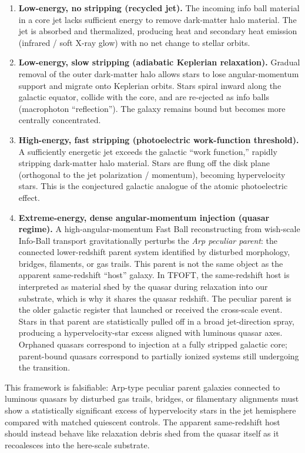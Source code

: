 \documentclass[11pt,a4paper]{article}
\begin{document}
\begin{enumerate}
  \item \textbf{Low-energy, no stripping (recycled jet).} The incoming info ball material in a core jet lacks sufficient energy to remove dark-matter halo material. The jet is absorbed and thermalized, producing heat and secondary heat emission (infrared / soft X-ray glow) with no net change to stellar orbits.

  \item \textbf{Low-energy, slow stripping (adiabatic Keplerian relaxation).} Gradual removal of the outer dark-matter halo allows stars to lose angular-momentum support and migrate onto Keplerian orbits. Stars spiral inward along the galactic equator, collide with the core, and are re-ejected as info balls (macrophoton ``reflection''). The galaxy remains bound but becomes more centrally concentrated.

  \item \textbf{High-energy, fast stripping (photoelectric work-function threshold).} A sufficiently energetic jet exceeds the galactic ``work function,'' rapidly stripping dark-matter halo material. Stars are flung off the disk plane (orthogonal to the jet polarization / momentum), becoming hypervelocity stars. This is the conjectured galactic analogue of the atomic photoelectric effect.

  \item \textbf{Extreme-energy, dense angular-momentum injection (quasar regime).} A high-angular-momentum Fast Ball reconstructing from wish-scale Info-Ball transport gravitationally perturbs the \emph{Arp peculiar parent}: the connected lower-redshift parent system identified by disturbed morphology, bridges, filaments, or gas trails. This parent is not the same object as the apparent same-redshift ``host'' galaxy. In TFOFT, the same-redshift host is interpreted as material shed by the quasar during relaxation into our substrate, which is why it shares the quasar redshift. The peculiar parent is the older galactic register that launched or received the cross-scale event. Stars in that parent are statistically pulled off in a broad jet-direction spray, producing a hypervelocity-star excess aligned with luminous quasar axes. Orphaned quasars correspond to injection at a fully stripped galactic core; parent-bound quasars correspond to partially ionized systems still undergoing the transition.
\end{enumerate}

This framework is falsifiable: Arp-type peculiar parent galaxies connected to luminous quasars by disturbed gas trails, bridges, or filamentary alignments must show a statistically significant excess of hypervelocity stars in the jet hemisphere compared with matched quiescent controls. The apparent same-redshift host should instead behave like relaxation debris shed from the quasar itself as it recoalesces into the here-scale substrate.
\end{document}
